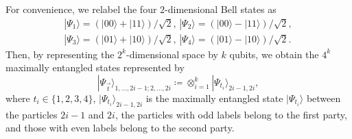 For convenience, we relabel the four $2$-dimensional Bell states as
\begin{align}
	|\Psi_1\rangle = (|00\rangle+|11\rangle)/\sqrt{2},\,
	|\Psi_2\rangle = (|00\rangle-|11\rangle)/\sqrt{2}, \nonumber\\
	|\Psi_3\rangle = (|01\rangle+|10\rangle)/\sqrt{2},\,
	|\Psi_4\rangle = (|01\rangle-|10\rangle)/\sqrt{2}.
\end{align}
Then, by representing the $2^k$-dimensional space by $k$ qubits, we obtain the $4^k$ maximally entangled states represented by 
\begin{equation}
	|\Psi_{\vec{t}}\rangle_{1,\ldots,2i-1;2,\ldots,2i} \coloneqq \otimes_{i=1}^k |\Psi_{t_i}\rangle_{2i-1,2i},
\end{equation}
where $t_i \in \{1, 2, 3, 4\}$, $|\Psi_{t_i}\rangle_{2i-1,2i}$ is the maximally entangled state $|\Psi_{t_i}\rangle$ between the particles $2i-1$ and $2i$, the particles with odd labels belong to the first party, and those with even labels belong to the second party.

